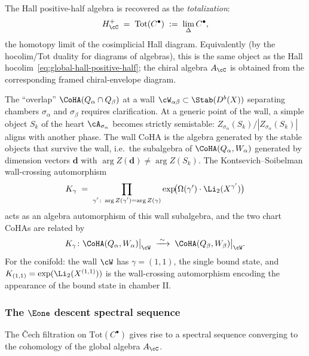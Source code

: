 The Hall positive-half algebra is recovered as the \emph{totalization}:
\begin{equation}
\label{eq:totalization}
 H^+_\cC \;=\; \mathrm{Tot}(C^\bullet) \;:=\; \lim_{\Delta} C^\bullet,
\end{equation}
the homotopy limit of the cosimplicial Hall diagram. Equivalently (by the hocolim/Tot duality for diagrams of algebras), this is the same object as the Hall hocolim~\eqref{eq:global-hall-positive-half}; the chiral algebra $A_\cC$ is obtained from the corresponding framed chiral-envelope diagram.

\begin{remark}
\label{rem:overlap-algebras}
The ``overlap'' $\CoHA(Q_\alpha \cap Q_\beta)$ at a wall $\cW_{\alpha\beta} \subset \Stab(D^b(X))$ separating chambers $\sigma_\alpha$ and $\sigma_\beta$ requires clarification. At a generic point of the wall, a simple object $S_k$ of the heart $\cA_{\sigma_\alpha}$ becomes strictly semistable: $Z_{\sigma_\alpha}(S_k) / |Z_{\sigma_\alpha}(S_k)|$ aligns with another phase. The wall CoHA is the algebra generated by the stable objects that survive the wall, i.e.\ the subalgebra of $\CoHA(Q_\alpha, W_\alpha)$ generated by dimension vectors $\mathbf{d}$ with $\arg Z(\mathbf{d}) \neq \arg Z(S_k)$. The Kontsevich--Soibelman wall-crossing automorphism
\begin{equation}
\label{eq:ks-wall-auto}
 K_\gamma \;=\; \prod_{\substack{\gamma' \colon \arg Z(\gamma') = \arg Z(\gamma)}} \exp\!\bigl(\Omega(\gamma') \cdot \Li_2(X^{\gamma'})\bigr)
\end{equation}
acts as an algebra automorphism of this wall subalgebra, and the two chart CoHAs are related by
\[
 K_\gamma \colon \CoHA(Q_\alpha, W_\alpha)\big|_{\cW} \;\xrightarrow{\;\sim\;}\; \CoHA(Q_\beta, W_\beta)\big|_{\cW}.
\]
For the conifold: the wall $\cW$ has $\gamma = (1,1)$, the single bound state, and $K_{(1,1)} = \exp(\Li_2(X^{(1,1)}))$ is the wall-crossing automorphism encoding the appearance of the bound state in chamber II.
\end{remark}

\subsubsection{The \texorpdfstring{$\Eone$}{E1} descent spectral sequence}
\label{subsubsec:e1-descent-ss}

The \v{C}ech filtration on $\mathrm{Tot}(C^\bullet)$ gives rise to a spectral sequence converging to the cohomology of the global algebra $A_\cC$.


